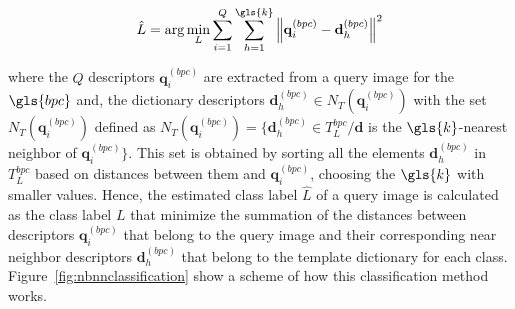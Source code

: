 \begin{equation}
\hat{L} = \arg \min_{L} \sum_{i=1}^{Q} \sum_{h=1}^{\gls{k}} {\left\lVert \mathbf{q}_{i}^{(bpc)} -  \mathbf{d}_{h}^{(bpc)} \right\rVert}  ^{2} 
\label{eq:classification}
\end{equation}

\noindent where the $Q$ descriptors $ \mathbf{q}_{i}^{(bpc)} $ are extracted from a query image for the $\gls{bpc}$ and, the dictionary descriptors  $\mathbf{d}_{h}^{(bpc)} \in N_T(  \mathbf{q}_{i}^{(bpc)} )$ with the set $N_T(  \mathbf{q}_{i}^{(bpc)} ) $ defined as $N_T(  \mathbf{q}_{i}^{(bpc)} ) = \{ \mathbf{d}_{h}^{(bpc)} \in T_{L}^{bpc} / \mathbf{d} $ is the $\gls{k}$-nearest neighbor of $  \mathbf{q}_{i}^{(bpc)} \}$.  This set is obtained by sorting all the elements $ \mathbf{d}_{h}^{(bpc)} $ in $T_{L}^{bpc}$ based on distances between them and $\mathbf{q}_{i}^{(bpc)}$, choosing the $\gls{k}$ with smaller values.  Hence, the estimated class label $\hat{L}$ of a query image is calculated as the class label $L$ that minimize the summation of the distances between descriptors $\mathbf{q}_{i}^{(bpc)}$ that belong to the query image and their corresponding near neighbor descriptors $\mathbf{d}_{h}^{(bpc)} $  that belong to the template dictionary for each class. Figure~\ref{fig:nbnnclassification} show a scheme of how this classification method works.


